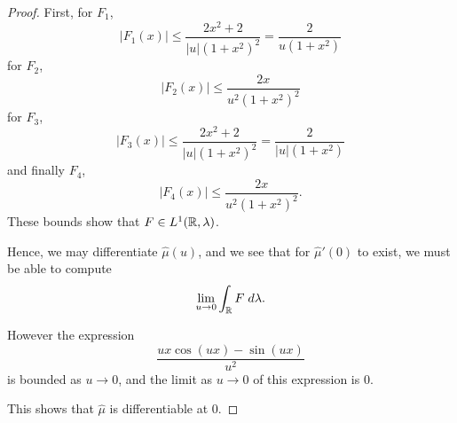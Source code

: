 \documentclass{unswmaths}
\begin{document}
\begin{proof}
    First, for $F_1$,
    \begin{equation*}
        |F_1(x)| \leq \frac{2x^2+2}{|u|(1+x^2)^2} = \frac{2}{u(1+x^2)}
    \end{equation*}
    for $F_2$,
    \begin{equation*}
        |F_2(x)| \leq \frac{2x}{u^2(1+x^2)^2}
    \end{equation*}
    for $F_3$,
    \begin{equation*}
        |F_3(x)| \leq \frac{2x^2+2}{|u|(1+x^2)^2} = \frac{2}{|u|(1+x^2)}
    \end{equation*}
    and finally $F_4$,
    \begin{equation*}
        |F_4(x)| \leq \frac{2x}{u^2(1+x^2)^2}.
    \end{equation*}
    These bounds show that $F \in L^1(\mathbb{R},\lambda)$.
    
    Hence, we may differentiate $\hat{\mu}(u)$, and we see that
    for $\hat{\mu}'(0)$ to exist, we must be able to compute
    \begin{equation*}
        \lim_{u\rightarrow 0} \int_{\mathbb{R}} F\;d\lambda.
    \end{equation*}
    
    However the expression
    \begin{equation*}
        \frac{ux\cos(ux)-\sin(ux)}{u^2}
    \end{equation*}
    is bounded as $u\rightarrow 0$, and the limit as
    $u\rightarrow 0$ of this expression is $0$.
    
    This shows that $\hat{\mu}$ is differentiable at $0$.
    

\end{proof}
\end{document}
